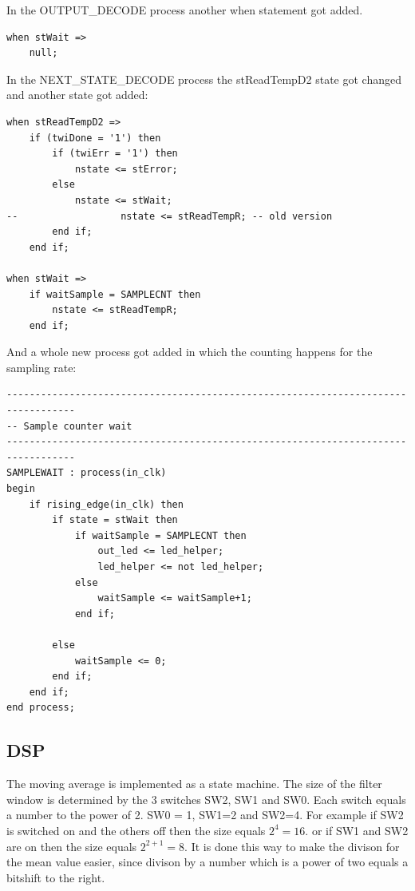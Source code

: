 In the OUTPUT_DECODE process another when statement got added.
\lstset{style=vhdl, firstnumber=349}
\begin{lstlisting}
when stWait =>
	null;
\end{lstlisting}

In the NEXT_STATE_DECODE process the stReadTempD2 state got changed and another state got added:
\lstset{style=vhdl, firstnumber=410}
\begin{lstlisting}
when stReadTempD2 =>
	if (twiDone = '1') then
		if (twiErr = '1') then
			nstate <= stError;
		else
			nstate <= stWait;
--                  nstate <= stReadTempR; -- old version
		end if;
	end if;
 
when stWait =>
	if waitSample = SAMPLECNT then
		nstate <= stReadTempR;
	end if;
\end{lstlisting}

And a whole new process got added in which the counting happens for the sampling rate:
\lstset{style=vhdl, firstnumber=265}
\begin{lstlisting}
---------------------------------------------------------------------------------- 
-- Sample counter wait               
----------------------------------------------------------------------------------  
SAMPLEWAIT : process(in_clk)                                       
begin                                                       
	if rising_edge(in_clk) then   
		if state = stWait then                       
			if waitSample = SAMPLECNT then             
				out_led <= led_helper; 
				led_helper <= not led_helper; 
			else 
				waitSample <= waitSample+1; 
			end if;                                                            

		else                                                                   
			waitSample <= 0;
		end if;                  
	end if;                 
end process;
\end{lstlisting}

\subsection{DSP}
The moving average is implemented as a state machine. The size of the filter window is determined
by the 3 switches SW2, SW1 and SW0. Each switch equals a number to the power of 2. 
SW0 = 1, SW1=2 and SW2=4. For example if SW2 is 
switched on and the others off then the size equals $2^{4}=16$. or if SW1 and SW2 are on then the
size equals $2^{2+1}=8$. It is done this way to make the divison for the mean value easier, since
divison by a number which is a power of two equals a bitshift to the right.


